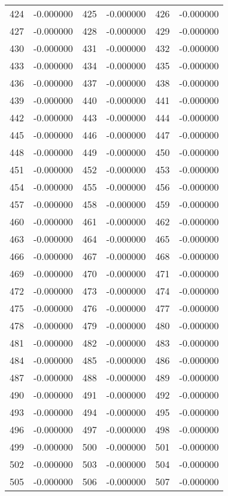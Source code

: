\documentclass[12pt]{article}
\begin{document}
\begin{longtable}{@{}cc|cc|cc@{}}
424 & -0.000000 & 425 & -0.000000 & 426 & -0.000000 \\
427 & -0.000000 & 428 & -0.000000 & 429 & -0.000000 \\
430 & -0.000000 & 431 & -0.000000 & 432 & -0.000000 \\
433 & -0.000000 & 434 & -0.000000 & 435 & -0.000000 \\
436 & -0.000000 & 437 & -0.000000 & 438 & -0.000000 \\
439 & -0.000000 & 440 & -0.000000 & 441 & -0.000000 \\
442 & -0.000000 & 443 & -0.000000 & 444 & -0.000000 \\
445 & -0.000000 & 446 & -0.000000 & 447 & -0.000000 \\
448 & -0.000000 & 449 & -0.000000 & 450 & -0.000000 \\
451 & -0.000000 & 452 & -0.000000 & 453 & -0.000000 \\
454 & -0.000000 & 455 & -0.000000 & 456 & -0.000000 \\
457 & -0.000000 & 458 & -0.000000 & 459 & -0.000000 \\
460 & -0.000000 & 461 & -0.000000 & 462 & -0.000000 \\
463 & -0.000000 & 464 & -0.000000 & 465 & -0.000000 \\
466 & -0.000000 & 467 & -0.000000 & 468 & -0.000000 \\
469 & -0.000000 & 470 & -0.000000 & 471 & -0.000000 \\
472 & -0.000000 & 473 & -0.000000 & 474 & -0.000000 \\
475 & -0.000000 & 476 & -0.000000 & 477 & -0.000000 \\
478 & -0.000000 & 479 & -0.000000 & 480 & -0.000000 \\
481 & -0.000000 & 482 & -0.000000 & 483 & -0.000000 \\
484 & -0.000000 & 485 & -0.000000 & 486 & -0.000000 \\
487 & -0.000000 & 488 & -0.000000 & 489 & -0.000000 \\
490 & -0.000000 & 491 & -0.000000 & 492 & -0.000000 \\
493 & -0.000000 & 494 & -0.000000 & 495 & -0.000000 \\
496 & -0.000000 & 497 & -0.000000 & 498 & -0.000000 \\
499 & -0.000000 & 500 & -0.000000 & 501 & -0.000000 \\
502 & -0.000000 & 503 & -0.000000 & 504 & -0.000000 \\
505 & -0.000000 & 506 & -0.000000 & 507 & -0.000000 \\

\end{longtable}
\end{document}
